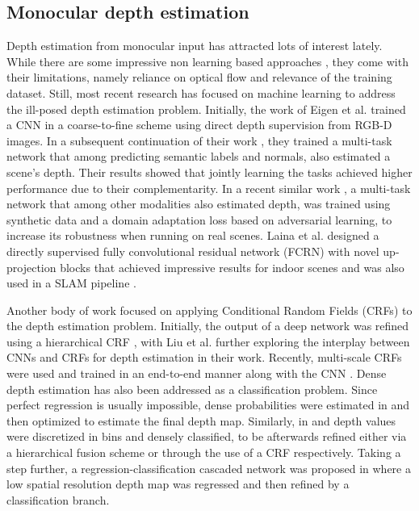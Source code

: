 \subsection{Monocular depth estimation}
\label{sec:monocular}
Depth estimation from monocular input has attracted lots of interest lately. While there are some impressive non learning based approaches \cite{ranftl2016dense,liu2014discrete,karsch2016depth}, they come with their limitations, namely reliance on optical flow and relevance of the training dataset. Still, most recent research has focused on machine learning to address the ill-posed depth estimation problem. Initially, the work of Eigen et al. \cite{eigen2014depth} trained a CNN in a coarse-to-fine scheme using direct depth supervision from RGB-D images. In a subsequent continuation of their work \cite{eigen2015predicting}, they trained a multi-task network that among predicting semantic labels and normals, also estimated a scene's depth. Their results showed that jointly learning the tasks achieved higher performance due to their complementarity. In a recent similar work \cite{ren-cvpr2018}, a multi-task network that among other modalities also estimated depth, was trained using synthetic data and a domain adaptation loss based on adversarial learning, to increase its robustness when running on real scenes. Laina et al. \cite{laina2016deeper} designed a directly supervised fully convolutional residual network (FCRN) with  novel up-projection blocks that achieved impressive results for indoor scenes and was also used in a SLAM pipeline \cite{tateno2017cnnslam}. 

Another body of work focused on applying Conditional Random Fields (CRFs) to the depth estimation problem. Initially, the output of a deep network was refined using a hierarchical CRF \cite{li2015depth}, with Liu et al. \cite{liu2016learning} further exploring the interplay between CNNs and CRFs for depth estimation in their work. Recently, multi-scale CRFs were used and trained in an end-to-end manner along with the CNN \cite{xu2017multi}. Dense depth estimation has also been addressed as a classification problem. Since perfect regression is usually impossible, dense probabilities were estimated in \cite{chakrabarti2016depth} and then optimized to estimate the final depth map. Similarly, in \cite{li2017monocular} and \cite{cao2017estimating} depth values were discretized in bins and densely classified, to be afterwards refined either via a hierarchical fusion scheme or through the use of a CRF respectively. Taking a step further, a regression-classification cascaded network was proposed in \cite{fu2017compromise} where a low spatial resolution depth map was regressed and then refined by a classification branch.

